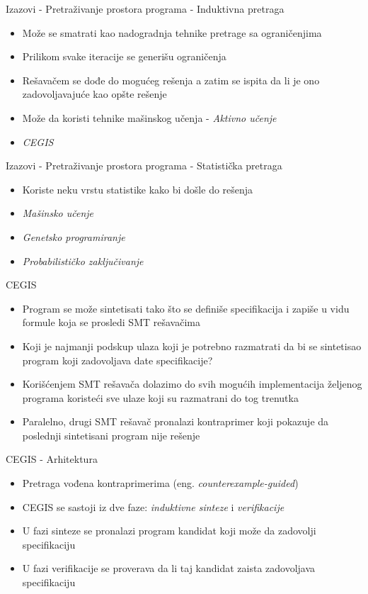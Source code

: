 \documentclass{beamer}
\begin{document}
\begin{frame}{Izazovi - Pretraživanje prostora programa - Induktivna pretraga}
    \begin{itemize}
        \item Može se smatrati kao nadogradnja tehnike pretrage sa ograničenjima
        \item Prilikom svake iteracije se generišu ograničenja
        \item Rešavačem se dođe do mogućeg rešenja a zatim se ispita da li je ono zadovoljavajuće kao opšte rešenje
        \item Može da koristi tehnike mašinskog učenja - \emph{Aktivno učenje}
        \item \emph{CEGIS}
    \end{itemize}
\end{frame}

\begin{frame}{Izazovi - Pretraživanje prostora programa - Statistička pretraga}
    \begin{itemize}
        \item Koriste neku vrstu statistike kako bi došle do rešenja
        \item \emph{Mašinsko učenje}
        \item \emph{Genetsko programiranje}
        \item \emph{Probabilističko zaključivanje}
    \end{itemize}
\end{frame}

\begin{frame}{CEGIS}
    \begin{itemize}
        \item Program se može sintetisati tako što se definiše specifikacija i zapiše u vidu formule koja se prosledi SMT rešavačima
        \item Koji je najmanji podskup ulaza koji je potrebno razmatrati da bi se sintetisao program koji zadovoljava date specifikacije?
        \item Korišćenjem SMT rešavača dolazimo do svih mogućih implementacija željenog programa koristeći sve ulaze koji su razmatrani do tog trenutka
        \item Paralelno, drugi SMT rešavač pronalazi kontraprimer koji pokazuje da poslednji sintetisani program nije rešenje
    \end{itemize}
\end{frame}

\begin{frame}{CEGIS - Arhitektura}
    \begin{itemize}
        \item Pretraga vođena kontraprimerima (eng. \emph{counterexample-guided})
        \item CEGIS se sastoji iz dve faze: \emph{induktivne sinteze} i \emph{verifikacije}
        \item U fazi sinteze se pronalazi program kandidat koji može da zadovolji specifikaciju
        \item U fazi verifikacije se proverava da li taj kandidat zaista zadovoljava specifikaciju
    \end{itemize}
\end{frame}
\end{document}
